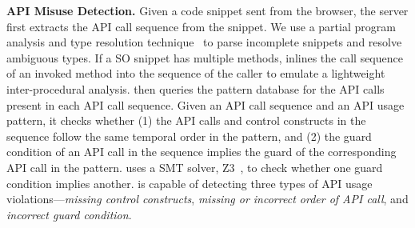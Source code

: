 {\bf API Misuse Detection.} Given a code snippet sent from the browser, the server first extracts the API call sequence from the snippet. We use a partial program analysis and type resolution technique~\cite{subramanian2014live} to parse incomplete snippets and resolve ambiguous types. If a SO snippet has multiple methods, {\tool} inlines the call sequence of an invoked method into the sequence of the caller to emulate a lightweight inter-procedural analysis. {\tool} then queries the pattern database for the API calls present in each API call sequence. Given an API call sequence and an API usage pattern, it checks whether (1) the API calls and control constructs in the sequence follow the same temporal order in the pattern, and (2) the guard condition of an API call in the sequence implies the guard of the corresponding API call in the pattern. {\tool} uses a SMT solver, Z3~\cite{de2008z3}, to check whether one guard condition implies another. {\tool} is capable of detecting three types of API usage violations---{\em missing control constructs}, {\em missing or incorrect order of API call}, and {\em incorrect guard condition}.



